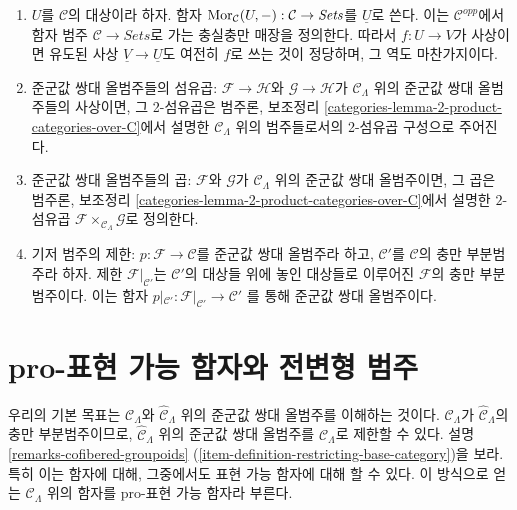 \begin{remarks}
\begin{enumerate}
\ref{categories-section-fibred-in-sets}절을 보라.
\item
\label{item-definition-yoneda}
$U$를 $\mathcal{C}$의 대상이라 하자. 함자
$\mathop{\mathrm{Mor}}\nolimits_\mathcal{C}(U, -): \mathcal{C} \to
\textit{Sets}$를 $\underline{U}$로 쓴다.
이는 $\mathcal C^{opp}$에서 함자 범주
$\mathcal{C} \to \textit{Sets}$로 가는 충실충만 매장을 정의한다.
따라서 $f : U \to V$가 사상이면 유도된 사상
$\underline{V} \to \underline{U}$도 여전히 $f$로 쓰는 것이
정당하며, 그 역도 마찬가지이다.
\item
\label{item-fibre-product}
준군값 쌍대 올범주들의 섬유곱: $\mathcal{F}
\to \mathcal{H}$와 $\mathcal{G} \to \mathcal{H}$가
$\mathcal{C}_\Lambda$ 위의 준군값 쌍대 올범주들의 사상이면,
그 2-섬유곱은 범주론, 보조정리
\ref{categories-lemma-2-product-categories-over-C}에서 설명한
$\mathcal{C}_\Lambda$ 위의 범주들로서의 2-섬유곱 구성으로 주어진다.
\item
\label{item-product}
준군값 쌍대 올범주들의 곱: $\mathcal{F}$와
$\mathcal{G}$가 $\mathcal{C}_\Lambda$ 위의 준군값 쌍대
올범주이면, 그 곱은 범주론, 보조정리
\ref{categories-lemma-2-product-categories-over-C}에서 설명한
$2$-섬유곱 $\mathcal{F} \times_{\mathcal{C}_\Lambda} \mathcal{G}$로
정의한다.
\item
\label{item-definition-restricting-base-category}
기저 범주의 제한: $p : \mathcal{F} \to \mathcal{C}$를 준군값
쌍대 올범주라 하고, $\mathcal{C}'$를 $\mathcal{C}$의 충만
부분범주라 하자. 제한 $\mathcal{F}|_{\mathcal{C}'}$는
$\mathcal{C}'$의 대상들 위에 놓인 대상들로 이루어진
$\mathcal{F}$의 충만 부분범주이다. 이는 함자
$p|_{\mathcal{C}'}: \mathcal{F}|_{\mathcal{C}'} \to \mathcal{C}'$
를 통해 준군값 쌍대 올범주이다.
\end{enumerate}
\end{remarks}

\section{pro-표현 가능 함자와 전변형 범주}
\label{section-cofibered-groupoids}

\noindent
우리의 기본 목표는 $\mathcal{C}_\Lambda$와
$\widehat{\mathcal{C}}_\Lambda$ 위의 준군값 쌍대 올범주를
이해하는 것이다. $\mathcal{C}_\Lambda$가
$\widehat{\mathcal{C}}_\Lambda$의 충만 부분범주이므로,
$\widehat{\mathcal{C}}_\Lambda$ 위의 준군값 쌍대 올범주를
$\mathcal{C}_\Lambda$로 제한할 수 있다. 설명
\ref{remarks-cofibered-groupoids}
(\ref{item-definition-restricting-base-category})을 보라.
특히 이는 함자에 대해, 그중에서도 표현 가능 함자에 대해 할 수 있다.
이 방식으로 얻는 $\mathcal{C}_\Lambda$ 위의 함자를
pro-표현 가능 함자라 부른다.

